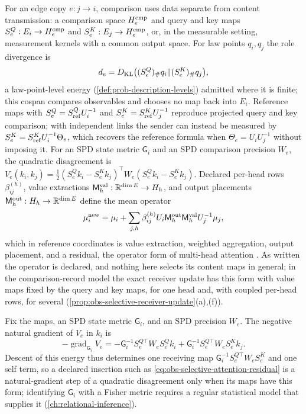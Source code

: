 For an edge copy \(e:j\to i\), comparison uses data separate from content
transmission: a comparison space \(H_e^{\rm cmp}\) and query and key maps
\(S^Q_e:E_i\to H_e^{\rm cmp}\) and \(S^K_e:E_j\to H_e^{\rm cmp}\), or, in the
measurable setting, measurement kernels with a common output space. For law
points \(q_i,q_j\) the role divergence is
\begin{equation}
d_e=D_{\mathrm{KL}}\bigl((S^Q_e)_\#q_i\Vert(S^K_e)_\#q_j\bigr),
\label{eq:obs-selective-role-divergence}
\end{equation}
a law-point-level energy (\cref{def:prob-description-levels}) admitted where it
is finite; this cospan compares observables and chooses no map back into
\(E_i\). Reference maps with \(S^Q_e=S^Q_{\rm ref}U_i^{-1}\) and
\(S^K_e=S^K_{\rm ref}U_j^{-1}\) reproduce projected query and key comparison;
with independent links the sender can instead be measured by
\(S^K_e=S^K_{\rm ref}U_i^{-1}\Theta_e\), which recovers the reference formula
when \(\Theta_e=U_iU_j^{-1}\) without imposing it. For an SPD state metric
\(\mathsf G_i\) and an SPD comparison precision \(W_e\), the quadratic
disagreement is
\(V_e(k_i,k_j)=\tfrac12(S^Q_ek_i-S^K_ek_j)^\top W_e(S^Q_ek_i-S^K_ek_j)\).
Declared per-head rows \(\beta_{ij}^{(h)}\), value extractions
\(\mathsf M^{\rm val}_h:\mathbb R^{\dim E}\to H_h\), and output placements
\(\mathsf M^{\rm out}_h:H_h\to\mathbb R^{\dim E}\) define the mean operator
\begin{equation}
\mu_i^{\rm new}=\mu_i+\sum_{j,h}
\beta_{ij}^{(h)}U_i\mathsf M^{\rm out}_h\mathsf M^{\rm val}_hU_j^{-1}\mu_j,
\label{eq:obs-selective-attention-residual}
\end{equation}
which in reference coordinates is value extraction, weighted aggregation,
output placement, and a residual, the operator form of multi-head attention
\citep{vaswani2017attention}. As written the operator is declared, and nothing
here selects its content maps in general; in the comparison-record model the
exact receiver update has this form with value maps fixed by the query and key
maps, for one head and, with coupled per-head rows, for several
(\cref{prop:obs-selective-receiver-update}(a),(f)).

Fix the maps, an SPD state metric \(\mathsf G_i\), and an SPD precision \(W_e\).
The negative natural gradient of \(V_e\) in \(k_i\) is
\begin{equation}
-\operatorname{grad}_{\mathsf G_i}V_e
=-\mathsf G_i^{-1}S_e^{Q\top}W_eS^Q_ek_i+\mathsf G_i^{-1}S_e^{Q\top}W_eS^K_ek_j.
\label{eq:obs-selective-response}
\end{equation}
Descent of this energy thus determines one receiving map
\(\mathsf G_i^{-1}S_e^{Q\top}W_eS^K_e\) and one self term, so a declared
insertion such as \eqref{eq:obs-selective-attention-residual} is a
natural-gradient step of a quadratic disagreement only when its maps have this
form; identifying \(\mathsf G_i\) with a Fisher metric requires a regular
statistical model that supplies it (\cref{ch:relational-inference}).

